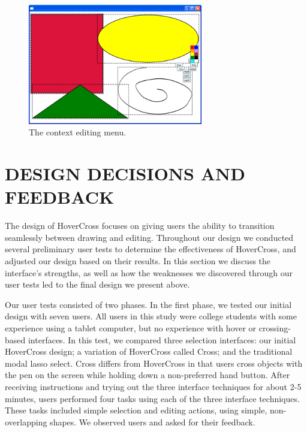\documentclass{article}
\begin{document}
\begin{figure}[tb]
\includegraphics[width=3.0in]{ColorMenu}
\caption{The context editing menu.}
\label{fig:contextMenu}
\end{figure}

\section{DESIGN DECISIONS AND FEEDBACK}
The design of HoverCross focuses on giving users the ability to transition seamlessly between drawing and editing.  
Throughout our design we conducted several preliminary user tests to determine the effectiveness of HoverCross, and adjusted our design based on their results.  In this section we discuss 
the interface's strengths, as well as how the weaknesses we discovered through our user tests led to the final design we present above.  


Our user tests consisted of two phases.  In the first phase, we tested our initial design with seven users.
All users in this study were college students with some experience using a tablet computer, but no experience 
with hover or crossing-based interfaces.  
In this test, we compared three selection interfaces: our initial HoverCross design; a variation of
HoverCross called Cross; and the traditional modal lasso select.  Cross
differs from HoverCross in that users cross objects with the pen on
the screen while holding down a non-preferred hand button.  After receiving instructions and trying out the three interface techniques for about 2-5 minutes, users performed four tasks using
each of the three interface techniques.  These tasks included simple selection and editing actions, using simple, non-overlapping shapes.  We observed users and asked for their feedback.
\end{document}
